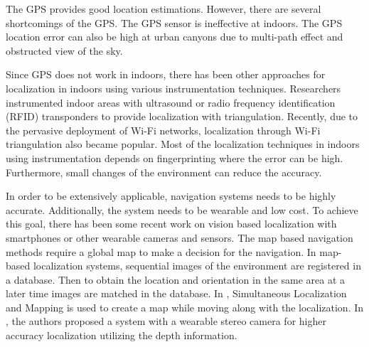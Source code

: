 The GPS provides good location estimations. 
However, there are several shortcomings of the GPS.
The GPS sensor is ineffective at indoors.
The GPS location error can also be high at urban canyons due to multi-path effect and obstructed view of the sky.

Since GPS does not work in indoors, there has been other approaches for localization in indoors using various instrumentation techniques. 
Researchers instrumented indoor areas with ultrasound \cite{drishti} or radio frequency identification (RFID) \cite{rfid} transponders to provide localization with triangulation.
Recently, due to the pervasive deployment of Wi-Fi networks, localization through Wi-Fi triangulation also became popular.  
Most of the localization techniques in indoors using instrumentation depends on fingerprinting where the error can be high.
Furthermore, small changes of the environment can reduce the accuracy.

In order to be extensively applicable, navigation systems needs to be highly accurate.
Additionally, the system needs to be wearable and low cost.
To achieve this goal, there has been some recent work on vision based localization with smartphones or other wearable cameras and sensors.
The map based navigation methods \cite{online,map,map2} require a global map to make a decision for the navigation. 
In map-based localization systems, sequential images of the environment are registered in a database.
Then to obtain the location and orientation in the same area at a later time images are matched in the database.
In \cite{fly,fly2,fly3}, Simultaneous Localization and Mapping is used to create a map while moving along with the localization.
In \cite{visual}, the authors proposed a system with a wearable stereo camera for higher accuracy localization utilizing the depth information.

